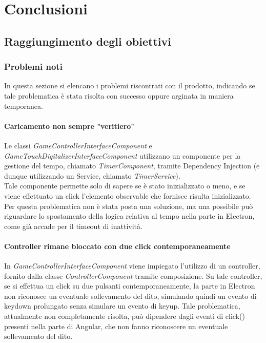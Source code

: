 \chapter{Conclusioni}
\label{cap:conclusioni}

\section{Raggiungimento degli obiettivi}
\subsection{Problemi noti}
In questa sezione si elencano i problemi riscontrati con il prodotto, indicando se tale problematica è stata risolta con successo oppure arginata in maniera temporanea.
\subsubsection{Caricamento non sempre "veritiero"}
Le classi \textit{GameControllerInterfaceComponent} e \\ \textit{GameTouchDigitalizerInterfaceComponent} utilizzano un componente per la gestione del tempo, chiamato \textit{TimerComponent}, tramite Dependency Injection (e dunque utilizzando un Service, chiamato \textit{TimerService}).\\
Tale componente permette solo di sapere se è stato inizializzato o meno, e se viene effettuato un click l'elemento observable che fornisce risulta inizializzato.\\
Per questa problematica non è stata posta una soluzione, ma una possibile può riguardare lo spostamento della logica relativa al tempo nella parte in Electron, come già accade per il timeout di inattività.
\subsubsection{Controller rimane bloccato con due click contemporaneamente}
In \textit{GameControllerInterfaceComponent} viene impiegato l'utilizzo di un controller, fornito dalla classe \textit{ControllerComponent} tramite composizione. Su tale controller, se si effettua un click su due pulsanti contemporaneamente, la parte in Electron non riconosce un eventuale sollevamento del dito, simulando quindi un evento di keydown prolungato senza simulare un evento di keyup. Tale problematica, attualmente non completamente risolta, può dipendere dagli eventi di click() presenti nella parte di Angular, che non fanno riconoscere un eventuale sollevamento del dito.
\newpage
